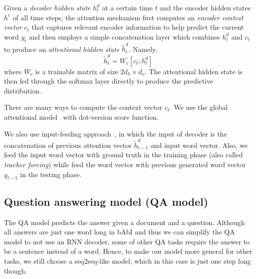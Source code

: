 \documentclass{article}
\begin{document}
Given a \emph{decoder hidden state} $h^d_t$ at a certain time $t$ and the encoder hidden states $h^e$ of all time steps, the attention mechanism first computes an \emph{encoder context vector} $c_t$ that captures relevant encoder information to help predict the current word $y_t$ and then employs a simple concatenation layer which combines $h^d_t$ and $c_t$ to produce an \emph{attentional hidden state} $\tilde{h}^d_t$. Namely,
\begin{equation}
    \tilde{h}^d_t=W_c[c_t; h^d_t]
\end{equation}
where $W_c$ is a trainable matrix of size $2d_h \times d_v$. The attentional hidden state is then fed through the softmax layer directly to produce the predictive distribution.

There are many ways to compute the context vector $c_t$. We use the global attentional model~\cite{lpm15:Luong} with dot-version score function.




We also use input-feeding approach~\cite{lpm15:Luong}, in which the input of decoder is the concatenation of previous attention vector $\tilde{h}^d_{t-1}$ and input word vector. Also, we feed the input word vector with ground truth in the training phase (also called \emph{teacher forcing}) while feed the word vector with previous generated word vector $y_{t-1}$ in the testing phase.

\subsection{Question answering model (QA model)}
The QA model predicts the answer given a document and a question. Although all answers are just one word long in bAbI and thus we can simplify the QA model to not use an RNN decoder, some of other QA tasks require the answer to be a sentence instead of a word. Hence, to make our model more general for other tasks, we still choose a seq2seq-like model, which in this case is just one step long though.
\end{document}
